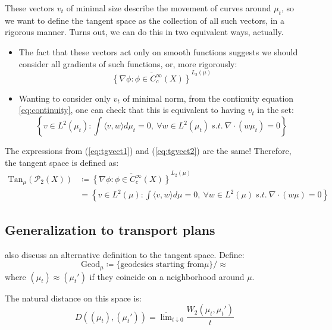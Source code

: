 \documentclass{article}
\begin{document}
These vectors $v_t$ of minimal size describe the movement of curves 
around $\mu_t$, so we want to define the tangent space as the collection 
of all such vectors, in a rigorous manner. Turns out, we can do this 
in two equivalent ways, actually.
\begin{itemize}
    \item The fact that these vectors act only on smooth functions suggests
    we should consider all gradients of such functions, or, more rigorously:
    \begin{equation}
        \label{eq:tgvect1}
        \overline{\left\{\nabla \phi : \phi\in C^\infty_c(X) \right\}}^{L_2(\mu)}
    \end{equation}
    \item Wanting to consider only $v_t$ of minimal norm, from the continuity
    equation \ref{eq:continuity}, one can check that this is equivalent to 
    having $v_t$ in the set:
    \begin{equation}
        \label{eq:tgvect2}
        \left\{v\in L^2(\mu_t) : \int\langle v,w\rangle d\mu_t = 0,\ \forall w \in L^2(\mu_t)\ s.t.\ \nabla\cdot(w\mu_t) = 0\right\}
    \end{equation}
\end{itemize}

The expressions from (\ref{eq:tgvect1}) and (\ref{eq:tgvect2}) are the same!
Therefore, the tangent space is defined as:
\begin{align*}
    \label{eq:tgvect}
    \text{Tan}_\mu(\mathscr{P}_2(X))&\coloneqq \overline{\left\{\nabla \phi : \phi\in C^\infty_c(X) \right\}}^{L_2(\mu)} \\
    &= \left\{v\in L^2(\mu) : \int\langle v,w\rangle d\mu = 0,\ \forall w \in L^2(\mu)\ s.t.\ \nabla\cdot(w\mu) = 0\right\}
\end{align*}

\subsection{Generalization to transport plans}

\cite{Ambrosio2013AUG} also discuss an alternative definition to the tangent space.
Define: 
\[\text{Geod}_\mu \coloneqq \{\text{geodesics starting from} \mu\}/\approx \]
where $(\mu_t)\approx (\mu_t')$ if they coincide on a neighborhood around $\mu$.

The natural distance on this space is:
\[D((\mu_t), (\mu_t')) = \overline{\lim}_{t\downarrow 0} \frac{W_2(\mu_t, \mu_t')}{t}\]
\end{document}
